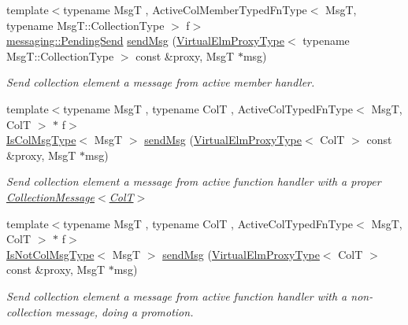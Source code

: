 \begin{DoxyCompactItemize}
{\footnotesize template$<$typename MsgT , Active\+Col\+Member\+Typed\+Fn\+Type$<$ Msg\+T, typename Msg\+T\+::\+Collection\+Type $>$ f$>$ }\\\hyperlink{structvt_1_1messaging_1_1_pending_send}{messaging\+::\+Pending\+Send} \hyperlink{structvt_1_1vrt_1_1collection_1_1_collection_manager_a3165b258fab15c35985b3f9b8ef0dbe7}{send\+Msg} (\hyperlink{namespacevt_1_1vrt_a620a5c8c59d13e513f690c74b4af516f}{Virtual\+Elm\+Proxy\+Type}$<$ typename Msg\+T\+::\+Collection\+Type $>$ const \&proxy, MsgT $\ast$msg)
\begin{DoxyCompactList}\small\item\em Send collection element a message from active member handler. \end{DoxyCompactList}\item 
{\footnotesize template$<$typename MsgT , typename ColT , Active\+Col\+Typed\+Fn\+Type$<$ Msg\+T, Col\+T $>$ $\ast$ f$>$ }\\\hyperlink{structvt_1_1vrt_1_1collection_1_1_collection_manager_a21c21612c806016788057aeab142af20}{Is\+Col\+Msg\+Type}$<$ MsgT $>$ \hyperlink{structvt_1_1vrt_1_1collection_1_1_collection_manager_a55777b57bfad6c9d87d946ed773a391d}{send\+Msg} (\hyperlink{namespacevt_1_1vrt_a620a5c8c59d13e513f690c74b4af516f}{Virtual\+Elm\+Proxy\+Type}$<$ ColT $>$ const \&proxy, MsgT $\ast$msg)
\begin{DoxyCompactList}\small\item\em Send collection element a message from active function handler with a proper {\ttfamily \hyperlink{structvt_1_1vrt_1_1collection_1_1_collection_message}{Collection\+Message$<$\+Col\+T$>$}} \end{DoxyCompactList}\item 
{\footnotesize template$<$typename MsgT , typename ColT , Active\+Col\+Typed\+Fn\+Type$<$ Msg\+T, Col\+T $>$ $\ast$ f$>$ }\\\hyperlink{structvt_1_1vrt_1_1collection_1_1_collection_manager_ae376deeefd4f89a0b1c93849977715d9}{Is\+Not\+Col\+Msg\+Type}$<$ MsgT $>$ \hyperlink{structvt_1_1vrt_1_1collection_1_1_collection_manager_a4f87f7f738cde8d48c9c18d16cc06166}{send\+Msg} (\hyperlink{namespacevt_1_1vrt_a620a5c8c59d13e513f690c74b4af516f}{Virtual\+Elm\+Proxy\+Type}$<$ ColT $>$ const \&proxy, MsgT $\ast$msg)
\begin{DoxyCompactList}\small\item\em Send collection element a message from active function handler with a non-\/collection message, doing a promotion. \end{DoxyCompactList}\item 

\end{DoxyCompactItemize}
